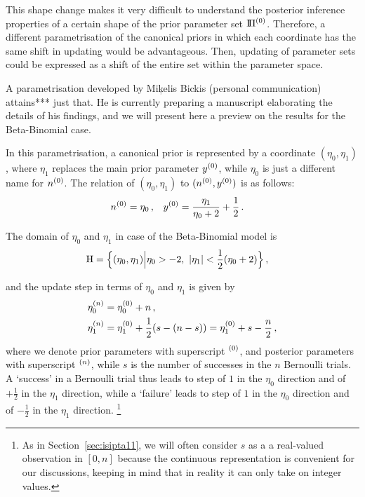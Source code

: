 This shape change makes it very difficult to understand the posterior inference properties
of a certain shape of the prior parameter set $\text{I}\!\Pi^{(0)}$.
Therefore, a different parametrisation of the canonical priors
in which each coordinate has the same shift in updating would be advantageous.
Then, updating of parameter sets
could be expressed as a shift of the entire set within the parameter space.

A parametrisation developed by Mi\c{k}elis Bickis (personal communication) attains*** just that.
He is currently preparing a manuscript elaborating the details of his findings,
and we will present here a preview on the results for the Beta-Binomial case.

In this parametrisation, a canonical prior is represented by a coordinate $(\eta_0,\eta_1)$,
where $\eta_1$ replaces the main prior parameter $y^{(0)}$,
while $\eta_0$ is just a different name for $n^{(0)}$.
The relation of $(\eta_0,\eta_1)$ to $(n^{(0)}, y^{(0)})$ is as follows:
\begin{align}
\label{eq:trafotony}
n^{(0)} &= \eta_0 \,, &
y^{(0)} &= \frac{\eta_1}{\eta_0 + 2} + \frac{1}{2}\,.
\end{align}

The domain of $\eta_0$ and $\eta_1$ in case of the Beta-Binomial model is
\begin{align}
\label{eq:eta-domain}
\mathrm{H} &= \Big\{ (\eta_0,\eta_1) \Big| \eta_0 > -2,\ |\eta_1| < \frac{1}{2}(\eta_0 + 2) \Big.\Big\}\,,
\end{align}

and the update step in terms of $\eta_0$ and $\eta_1$ is given by
\begin{equation}
\label{eq:eta-update}
\begin{aligned}
\eta_0^{(n)} &= \eta_0^{(0)} + n\,, \\
\eta_1^{(n)} &= \eta_1^{(0)} + \frac{1}{2}(s - (n-s)) = \eta_1^{(0)} + s - \frac{n}{2}\,,
\end{aligned}
\end{equation}
where we denote prior parameters with superscript ${}^{(0)}$, and posterior parameters with superscript ${}^{(n)}$,
while $s$ is the number of successes in the $n$ Bernoulli trials.
A `success' in a Bernoulli trial thus
leads to step of $1$ in the $\eta_0$ direction and of $+\frac{1}{2}$ in the $\eta_1$ direction,
while a `failure'
leads to step of $1$ in the $\eta_0$ direction and of $-\frac{1}{2}$ in the $\eta_1$ direction.%
\footnote{As in Section~\ref{sec:isipta11}, we  
will often consider $s$ as a a real-valued observation in $[0,n]$
because the continuous representation is convenient for our discussions,
keeping in mind that in reality it can only take on integer values.}

